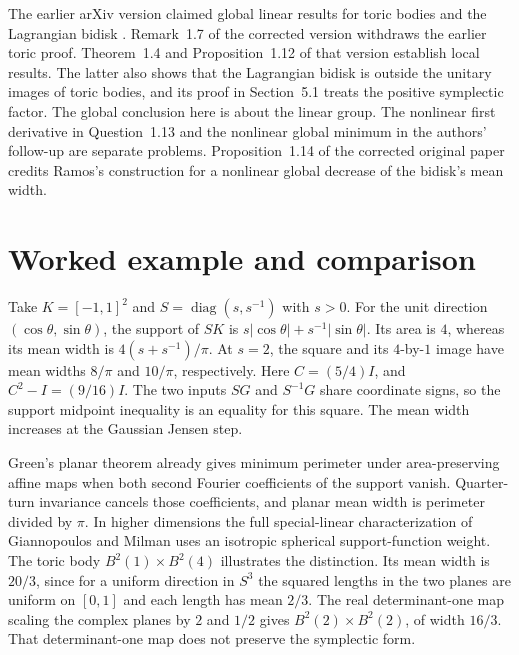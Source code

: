 \documentclass[11pt,a4paper]{amsart}
\begin{document}
The earlier arXiv version claimed global linear results for toric bodies and the Lagrangian bidisk \cite[Theorems~1.18--1.19]{ahn-kerman-early}. Remark~1.7 of the corrected version withdraws the earlier toric proof. Theorem~1.4 and Proposition~1.12 of that version establish local results. The latter also shows that the Lagrangian bidisk is outside the unitary images of toric bodies, and its proof in Section~5.1 treats the positive symplectic factor. The global conclusion here is about the linear group. The nonlinear first derivative in Question~1.13 and the nonlinear global minimum in the authors' follow-up \cite[Conjecture~3.8]{ahn-kerman-followup} are separate problems. Proposition~1.14 of the corrected original paper credits Ramos's construction for a nonlinear global decrease of the bidisk's mean width.

\section{Worked example and comparison}\label{sec:example}
Take \(K=[-1,1]^2\) and \(S=\operatorname{diag}(s,s^{-1})\) with \(s>0\). For the unit direction \((\cos\theta,\sin\theta)\), the support of \(SK\) is \(s|\cos\theta|+s^{-1}|\sin\theta|\). Its area is \(4\), whereas its mean width is \(4(s+s^{-1})/\pi\). At \(s=2\), the square and its \(4\)-by-\(1\) image have mean widths \(8/\pi\) and \(10/\pi\), respectively. Here \(C=(5/4)I\), and \(C^2-I=(9/16)I\). The two inputs \(SG\) and \(S^{-1}G\) share coordinate signs, so the support midpoint inequality is an equality for this square. The mean width increases at the Gaussian Jensen step.

Green's planar theorem \cite[Theorem~1]{green} already gives minimum perimeter under area-preserving affine maps when both second Fourier coefficients of the support vanish. Quarter-turn invariance cancels those coefficients, and planar mean width is perimeter divided by \(\pi\). In higher dimensions the full special-linear characterization of Giannopoulos and Milman \cite[Theorem~3.1]{giannopoulos-milman} uses an isotropic spherical support-function weight. The toric body \(B^2(1)\times B^2(4)\) illustrates the distinction. Its mean width is \(20/3\), since for a uniform direction in \(S^3\) the squared lengths in the two planes are uniform on \([0,1]\) and each length has mean \(2/3\). The real determinant-one map scaling the complex planes by \(2\) and \(1/2\) gives \(B^2(2)\times B^2(2)\), of width \(16/3\). That determinant-one map does not preserve the symplectic form.
\end{document}
